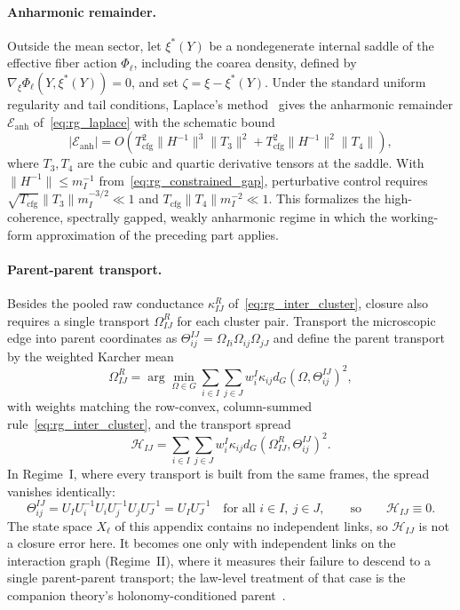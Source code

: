\documentclass[11pt]{article}
\begin{document}
\paragraph{Anharmonic remainder.}
Outside the mean sector, let $\xi^*(Y)$ be a nondegenerate internal saddle of the effective fiber action $\Phi_\ell$, including the coarea density, defined by $\nabla_\xi\Phi_\ell(Y,\xi^*(Y))=0$, and set $\zeta=\xi-\xi^*(Y)$. Under the standard uniform regularity and tail conditions, Laplace's method~\cite{wong2001asymptotic} gives the anharmonic remainder $\mathcal{E}_{\mathrm{anh}}$ of~\eqref{eq:rg_laplace} with the schematic bound
\begin{equation}
|\mathcal{E}_{\mathrm{anh}}|
=O\left(T_{\mathrm{cfg}}^2\|H^{-1}\|^3\|T_3\|^2+T_{\mathrm{cfg}}^2\|H^{-1}\|^2\|T_4\|\right),
\end{equation}
where $T_3,T_4$ are the cubic and quartic derivative tensors at the saddle. With $\|H^{-1}\|\leq m_I^{-1}$ from~\eqref{eq:rg_constrained_gap}, perturbative control requires $\sqrt{T_{\mathrm{cfg}}}\|T_3\|m_I^{-3/2}\ll1$ and $T_{\mathrm{cfg}}\|T_4\|m_I^{-2}\ll1$. This formalizes the high-coherence, spectrally gapped, weakly anharmonic regime in which the working-form approximation of the preceding part applies.

\paragraph{Parent-parent transport.}
Besides the pooled raw conductance $\kappa_{IJ}^R$ of~\eqref{eq:rg_inter_cluster}, closure also requires a single transport $\Omega_{IJ}^R$ for each cluster pair. Transport the microscopic edge into parent coordinates as $\Theta_{ij}^{IJ} = \Omega_{Ii}\Omega_{ij}\Omega_{jJ}$ and define the parent transport by the weighted Karcher mean
\begin{equation}
\Omega_{IJ}^R = \arg\min_{\Omega \in G} \sum_{i \in I}\sum_{j \in J} w_i^I \kappa_{ij} d_G(\Omega, \Theta_{ij}^{IJ})^2,
\end{equation}
with weights matching the row-convex, column-summed rule~\eqref{eq:rg_inter_cluster}, and the transport spread
\begin{equation}
\mathcal{H}_{IJ} = \sum_{i \in I}\sum_{j \in J} w_i^I \kappa_{ij} d_G(\Omega_{IJ}^R, \Theta_{ij}^{IJ})^2 .
\end{equation}
In Regime~I, where every transport is built from the same frames, the spread vanishes identically:
\begin{equation}
\Theta_{ij}^{IJ}=U_IU_i^{-1}U_iU_j^{-1}U_jU_J^{-1}=U_IU_J^{-1}\quad\text{for all } i\in I,\ j\in J,
\qquad\text{so}\qquad \mathcal{H}_{IJ}\equiv0 .
\label{eq:rg_holonomy_trivial}
\end{equation}
The state space $X_\ell$ of this appendix contains no independent links, so $\mathcal{H}_{IJ}$ is not a closure error here. It becomes one only with independent links on the interaction graph (Regime~II), where it measures their failure to descend to a single parent-parent transport; the law-level treatment of that case is the companion theory's holonomy-conditioned parent~\cite[Ch.~10]{DennisGaugeVFE2026}.
\end{document}
